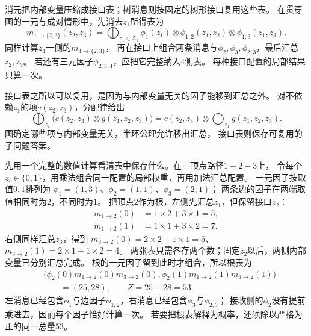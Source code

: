 消元把内部变量压缩成接口表；树消息则按固定的树形接口复用这些表。
在贯穿图的一元与成对情形中，先消去\(z_1\)所得表为
\begin{equation}
  m_{1\to\{2,3\}}(z_2,z_3)=
  \bigoplus_{z_1\in\mathcal Z_1}
  \phi_1(z_1)\otimes\phi_{1,2}(z_1,z_2)\otimes\phi_{1,3}(z_1,z_3).
  \label{eq:graph-theory-interface-message}
\end{equation}
同样计算\(z_4\)一侧的\(m_{4\to\{2,3\}}\)，
再在接口上组合两条消息与\(\phi_2,\phi_3,\phi_{2,3}\)，最后汇总\(z_2,z_3\)。
若还有三元因子\(\phi_{2,3,4}\)，应把它完整纳入\(4\)侧表。
每种接口配置的局部结果只算一次。

接口表之所以可以复用，是因为与内部变量无关的因子能移到汇总之外。
对不依赖\(z_1\)的项\(c(z_2,z_3)\)，分配律给出
\[
  \bigoplus_{z_1}\bigl(c(z_2,z_3)\otimes g(z_1,z_2,z_3)\bigr)
  =c(z_2,z_3)\otimes\bigoplus_{z_1}g(z_1,z_2,z_3).
\]
图确定哪些项与内部变量无关，半环公理允许移出汇总，
接口表则保存可复用的子问题答案。

先用一个完整的数值计算看清表中保存什么。在三顶点路径$1-2-3$上，
令每个$z_i\in\{0,1\}$，用乘法组合同一配置的局部权重，再用加法汇总配置。
一元因子按取值$0,1$排列为
$\phi_1=(1,3)$、$\phi_2=(1,1)$、$\phi_3=(2,1)$；
两条边的因子在两端取值相同时为$2$，不同时为$1$。
把顶点$2$作为根，左侧先汇总$z_1$，但保留接口$z_2$：
\begin{equation}
 \begin{aligned}
  m_{1\to2}(0)&=1\times2+3\times1=5,\\
  m_{1\to2}(1)&=1\times1+3\times2=7.
 \end{aligned}
 \label{eq:graph-theory-message-numeric-left}
\end{equation}
右侧同样汇总$z_3$，得到
$m_{3\to2}(0)=2\times2+1\times1=5$、
$m_{3\to2}(1)=2\times1+1\times2=4$。
两张表只需各存两个数；固定$z_2$以后，两侧内部变量已分别汇总完成。
根的一元因子留到此时才组合，所以根表为
\begin{equation}
 \begin{aligned}
  &\bigl(\phi_2(0)m_{1\to2}(0)m_{3\to2}(0),
        \phi_2(1)m_{1\to2}(1)m_{3\to2}(1)\bigr)\\
  &\qquad=(25,28),\qquad Z=25+28=53.
 \end{aligned}
  \label{eq:graph-theory-message-numeric-root}
\end{equation}
左消息已经包含$\phi_1$与边因子$\phi_{1,2}$，右消息已经包含$\phi_3$与$\phi_{2,3}$；
接收侧的$\phi_2$没有提前乘进去，因而每个因子恰好计算一次。
若要把根表解释为概率，还须除以严格为正的同一总量$53$。

